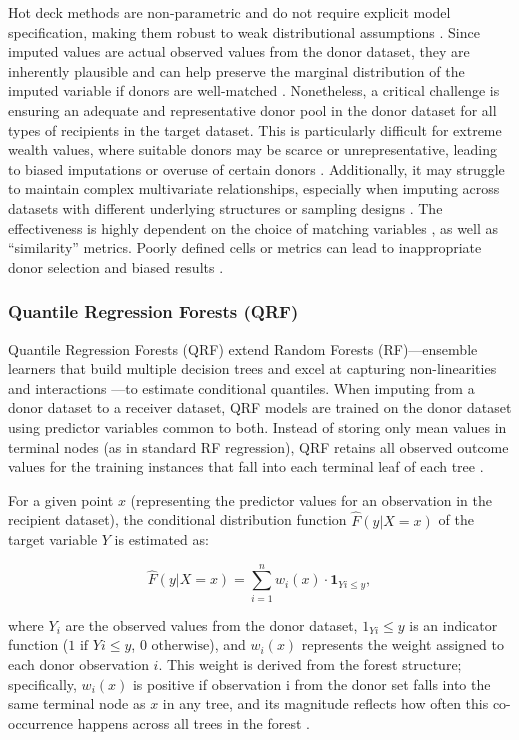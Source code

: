 Hot deck methods are non-parametric and do not require explicit model specification, making them robust to weak distributional assumptions \citep{dorazio2021statistical}. Since imputed values are actual observed values from the donor dataset, they are inherently plausible and can help preserve the marginal distribution of the imputed variable if donors are well-matched \citep{andridge2010review}. Nonetheless, a critical challenge is ensuring an adequate and representative donor pool in the donor dataset for all types of recipients in the target dataset. This is particularly difficult for extreme wealth values, where suitable donors may be scarce or unrepresentative, leading to biased imputations or overuse of certain donors \citep{haziza2009imputation}. Additionally, it may struggle to maintain complex multivariate relationships, especially when imputing across datasets with different underlying structures or sampling designs \citep{siddique2008multiple}. The effectiveness is highly dependent on the choice of matching variables \citep{ota2012revenue}, as well as “similarity” metrics. Poorly defined cells or metrics can lead to inappropriate donor selection and biased results \citep{andridge2010review}.

\subsubsection{Quantile Regression Forests (QRF)}

Quantile Regression Forests (QRF) \citep{meinshausen2006quantile} extend Random Forests (RF)—ensemble learners that build multiple decision trees and excel at capturing non-linearities and interactions \citep{breiman2001random}—to estimate conditional quantiles. When imputing from a donor dataset to a receiver dataset, QRF models are trained on the donor dataset using predictor variables common to both. Instead of storing only mean values in terminal nodes (as in standard RF regression), QRF retains all observed outcome values for the training instances that fall into each terminal leaf of each tree \citep{meinshausen2006quantile}. 

For a given point $x$ (representing the predictor values for an observation in the recipient dataset), the conditional distribution function $\hat{F}(y|X=x)$ of the target variable $Y$ is estimated as:

$$\hat{F}(y|X=x) = \sum_{i=1}^n w_i(x) \cdot \mathbf{1}_{{Yi \leq y}},$$

where $Y_i$ are the observed values from the donor dataset, $1_{Yi} \leq y$ is an indicator function ($1 \text{ if } Yi \leq y$, $0 \text{ otherwise}$), and $w_i(x)$ represents the weight assigned to each donor observation $i$. This weight is derived from the forest structure; specifically, $w_i(x)$ is positive if observation i from the donor set falls into the same terminal node as $x$ in any tree, and its magnitude reflects how often this co-occurrence happens across all trees in the forest \citep{kleinke2023robust}.

